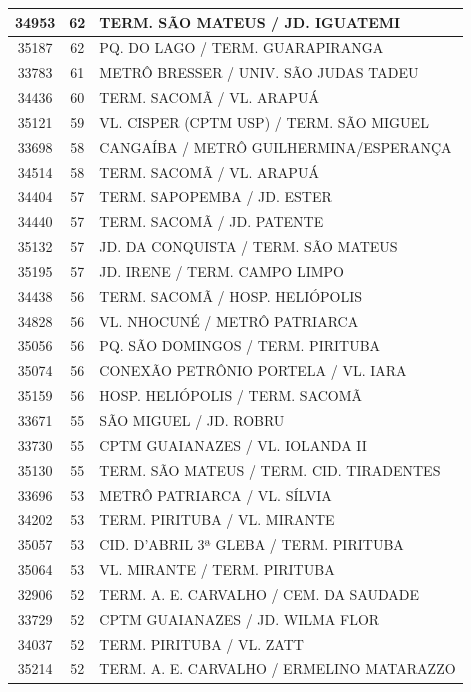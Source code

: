 \documentclass[
	12pt,				%
	oneside,			%
	a4paper,			%
	english,			%
	brazil				%
	]{abntex2ppgsi}
\begin{document}
{{{\begin{apendicesenv}
\begin{longtable}{c|c|p{7cm}}
 \hline 
34953 &	62 &	TERM. SÃO MATEUS / JD. IGUATEMI \\ 
 \hline 
35187 &	62 &	PQ. DO LAGO / TERM. GUARAPIRANGA \\ 
 \hline 
33783 &	61 &	METRÔ BRESSER / UNIV. SÃO JUDAS TADEU \\ 
 \hline 
34436 &	60 &	TERM. SACOMÃ / VL. ARAPUÁ \\ 
 \hline 
35121 &	59 &	VL. CISPER (CPTM USP) / TERM. SÃO MIGUEL \\ 
 \hline 
33698 &	58 &	CANGAÍBA / METRÔ GUILHERMINA/ESPERANÇA \\ 
 \hline 
34514 &	58 &	TERM. SACOMÃ / VL. ARAPUÁ \\ 
 \hline 
34404 &	57 &	TERM. SAPOPEMBA / JD. ESTER \\ 
 \hline 
34440 &	57 &	TERM. SACOMÃ / JD. PATENTE \\ 
 \hline 
35132 &	57 &	JD. DA CONQUISTA / TERM. SÃO MATEUS \\ 
 \hline 
35195 &	57 &	JD. IRENE / TERM. CAMPO LIMPO \\ 
 \hline 
34438 &	56 &	TERM. SACOMÃ / HOSP. HELIÓPOLIS \\ 
 \hline 
34828 &	56 &	VL. NHOCUNÉ / METRÔ PATRIARCA \\ 
 \hline 
35056 &	56 &	PQ. SÃO DOMINGOS / TERM. PIRITUBA \\ 
 \hline 
35074 &	56 &	CONEXÃO PETRÔNIO PORTELA / VL. IARA \\ 
 \hline 
35159 &	56 &	HOSP. HELIÓPOLIS / TERM. SACOMÃ \\ 
 \hline 
33671 &	55 &	SÃO MIGUEL / JD. ROBRU \\ 
 \hline 
33730 &	55 &	CPTM GUAIANAZES / VL. IOLANDA II \\ 
 \hline 
35130 &	55 &	TERM. SÃO MATEUS / TERM. CID. TIRADENTES \\ 
 \hline 
33696 &	53 &	METRÔ PATRIARCA / VL. SÍLVIA \\ 
 \hline 
34202 &	53 &	TERM. PIRITUBA / VL. MIRANTE \\ 
 \hline 
35057 &	53 &	CID. D’ABRIL 3ª GLEBA / TERM. PIRITUBA \\ 
 \hline 
35064 &	53 &	VL. MIRANTE / TERM. PIRITUBA \\ 
 \hline 
32906 &	52 &	TERM. A. E. CARVALHO / CEM. DA SAUDADE \\ 
 \hline 
33729 &	52 &	CPTM GUAIANAZES / JD. WILMA FLOR \\ 
 \hline 
34037 &	52 &	TERM. PIRITUBA / VL. ZATT \\ 
 \hline 
35214 &	52 &	TERM. A. E. CARVALHO / ERMELINO MATARAZZO \\ 

\end{longtable}
\end{apendicesenv}}}}
\end{document}
